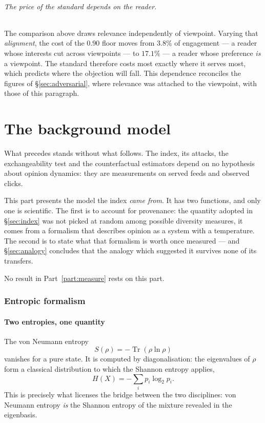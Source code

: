 \documentclass[11pt,a4paper]{article}
\begin{document}
\paragraph{The price of the standard depends on the reader.} The comparison above draws relevance
independently of viewpoint. Varying that \emph{alignment}, the cost of the $0.90$ floor moves from
$3.8\%$ of engagement --- a reader whose interests cut across viewpoints --- to $17.1\%$ --- a
reader whose preference \emph{is} a viewpoint. The standard therefore costs most exactly where it
serves most, which predicts where the objection will fall. This dependence reconciles the figures
of \S\ref{sec:adversarial}, where relevance was attached to the viewpoint, with those of this
paragraph.


\part{The background model}
\label{part:model}

What precedes stands without what follows. The index, its attacks, the exchangeability test and
the counterfactual estimators depend on no hypothesis about opinion dynamics: they are
measurements on served feeds and observed clicks.

This part presents the model the index \emph{came from}. It has two functions, and only one is
scientific. The first is to account for provenance: the quantity adopted in \S\ref{sec:index}
was not picked at random among possible diversity measures, it comes from a formalism that
describes opinion as a system with a temperature. The second is to state what that formalism is
worth once measured --- and \S\ref{sec:analogy} concludes that the analogy which suggested it
survives none of its transfers.

No result in Part~\ref{part:measure} rests on this part.

\section{Entropic formalism}

\subsection{Two entropies, one quantity}

The von Neumann entropy \citep{vonneumann1932}
\begin{equation}
S(\rho) = -\operatorname{Tr}(\rho \ln \rho)
\end{equation}
vanishes for a pure state. It is computed by diagonalisation: the eigenvalues of $\rho$
form a classical distribution to which the Shannon entropy \citep{shannon1948} applies,
\begin{equation}
H(X) = -\sum_i p_i \log_2 p_i .
\end{equation}
This is precisely what licenses the bridge between the two disciplines: von Neumann entropy
\emph{is} the Shannon entropy of the mixture revealed in the eigenbasis.
\end{document}
